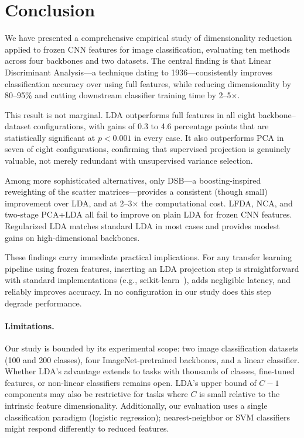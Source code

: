 \section{Conclusion}
\label{sec:conclusion}

We have presented a comprehensive empirical study of dimensionality reduction applied to frozen CNN features for image classification, evaluating ten methods across four backbones and two datasets. The central finding is that Linear Discriminant Analysis---a technique dating to 1936---consistently improves classification accuracy over using full features, while reducing dimensionality by 80--95\% and cutting downstream classifier training time by 2--5$\times$.

This result is not marginal. LDA outperforms full features in all eight backbone--dataset configurations, with gains of 0.3 to 4.6 percentage points that are statistically significant at $p < 0.001$ in every case. It also outperforms PCA in seven of eight configurations, confirming that supervised projection is genuinely valuable, not merely redundant with unsupervised variance selection.

Among more sophisticated alternatives, only DSB---a boosting-inspired reweighting of the scatter matrices---provides a consistent (though small) improvement over LDA, and at 2--3$\times$ the computational cost. LFDA, NCA, and two-stage PCA+LDA all fail to improve on plain LDA for frozen CNN features. Regularized LDA matches standard LDA in most cases and provides modest gains on high-dimensional backbones.

These findings carry immediate practical implications. For any transfer learning pipeline using frozen features, inserting an LDA projection step is straightforward with standard implementations (e.g., scikit-learn~\cite{sklearn}), adds negligible latency, and reliably improves accuracy. In no configuration in our study does this step degrade performance.

\paragraph{Limitations.} Our study is bounded by its experimental scope: two image classification datasets (100 and 200 classes), four ImageNet-pretrained backbones, and a linear classifier. Whether LDA's advantage extends to tasks with thousands of classes, fine-tuned features, or non-linear classifiers remains open. LDA's upper bound of $C-1$ components may also be restrictive for tasks where $C$ is small relative to the intrinsic feature dimensionality. Additionally, our evaluation uses a single classification paradigm (logistic regression); nearest-neighbor or SVM classifiers might respond differently to reduced features.

